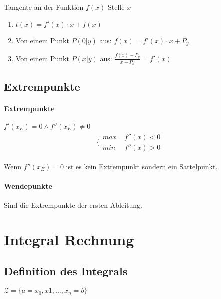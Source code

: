 \documentclass[12pt]{article}
\begin{document}
Tangente an der Funktion \( f(x) \) Stelle \( x \)

\begin{enumerate}
	\item \( t(x) =  f'(x) \cdot x + f(x) \)
	\item Von einem Punkt \( P(0 \vert y)  \) aus: \( f(x) = f'(x) \cdot x + P_y\)
	\item Von einem Punkt \( P(x \vert y) \) aus: \( \frac{f(x) - P_y}{x - P_x} = f'(x) \)
\end{enumerate}

\subsection{ Extrempunkte }

\paragraph{ Extrempunkte } \( f'(x_E) = 0 \land f''(x_E) \neq 0  \)  
\begin{align*}
	\bigg \lbrace \begin{matrix}
		\textit{max } & f''(x) < 0 \\
		\textit{min } & f''(x) > 0
	\end{matrix}
\end{align*}

Wenn \( f''(x_E) = 0 \) ist es kein Extrempunkt sondern ein Sattelpunkt.

\paragraph{Wendepunkte} Sind die Extrempunkte der ersten Ableitung.
\section{Integral Rechnung}

\subsection{Definition des Integrals}

$ \mathcal{Z} = \lbrace a = x_0, x1, \dots, x_n = b \rbrace$
\end{document}
